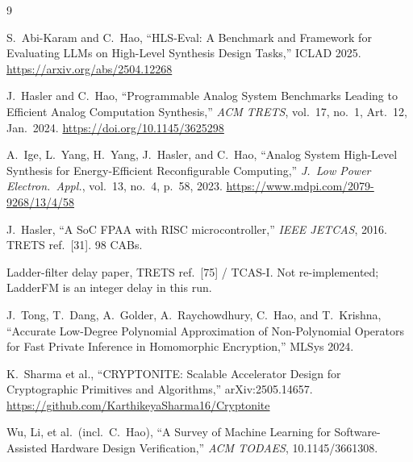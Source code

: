 \documentclass[11pt]{article}
\begin{document}
\begin{thebibliography}{9}

S.~Abi-Karam and C.~Hao,
``HLS-Eval: A Benchmark and Framework for Evaluating LLMs on High-Level
Synthesis Design Tasks,''
ICLAD 2025.
\url{https://arxiv.org/abs/2504.12268}

J.~Hasler and C.~Hao,
``Programmable Analog System Benchmarks Leading to Efficient Analog
Computation Synthesis,''
\emph{ACM TRETS}, vol.~17, no.~1, Art.~12, Jan.~2024.
\url{https://doi.org/10.1145/3625298}

A.~Ige, L.~Yang, H.~Yang, J.~Hasler, and C.~Hao,
``Analog System High-Level Synthesis for Energy-Efficient Reconfigurable
Computing,''
\emph{J.\ Low Power Electron.\ Appl.}, vol.~13, no.~4, p.~58, 2023.
\url{https://www.mdpi.com/2079-9268/13/4/58}

J.~Hasler,
``A SoC FPAA with RISC microcontroller,''
\emph{IEEE JETCAS}, 2016.
TRETS ref.~[31]. 98 CABs.

Ladder-filter delay paper, TRETS ref.~[75] / TCAS-I.
Not re-implemented; LadderFM is an integer delay in this run.

J.~Tong, T.~Dang, A.~Golder, A.~Raychowdhury, C.~Hao, and T.~Krishna,
``Accurate Low-Degree Polynomial Approximation of Non-Polynomial Operators
for Fast Private Inference in Homomorphic Encryption,''
MLSys 2024.

K.~Sharma et al.,
``CRYPTONITE: Scalable Accelerator Design for Cryptographic Primitives
and Algorithms,''
arXiv:2505.14657.
\url{https://github.com/KarthikeyaSharma16/Cryptonite}

Wu, Li, et al.\ (incl.\ C.~Hao),
``A Survey of Machine Learning for Software-Assisted Hardware Design
Verification,''
\emph{ACM TODAES}, 10.1145/3661308.

\end{thebibliography}
\end{document}
